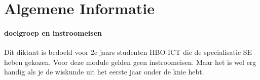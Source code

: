 \newcommand{\vecdriesnel}[1] {
$$
\begin{pmatrix} 
#1_1  \\ 
#1_2  \\ 
#1_3
\end{pmatrix}       $$}
\newcommand{\vectwee}[3][black] {
$$
\color{#1}
\begin{pmatrix} 
#2  \\ 
#3 
\end{pmatrix}       $$}
\newcommand{\vectweesnel}[1] {
$$
\begin{pmatrix} 
#1_1  \\ 
#1_2  
\end{pmatrix}       $$}
\newcommand{\vecvier}[4] {
$$
\begin{pmatrix} 
#1  \\ 
#2  \\ 
#3  \\
#4
\end{pmatrix}       $$}
\newcommand{\V}[1]{
$ \vec{#1} $}
\newcommand{\mattwee}[2]{
\begin{pmatrix}
#1 \\
#2
\end{pmatrix}}
\newcommand{\matdrie}[3]{
\begin{pmatrix}
#1 \\
#2 \\
#3
\end{pmatrix}}
\newcommand{\matvier}[4]{
\begin{pmatrix}
#1 \\
#2 \\
#3 \\
#4
\end{pmatrix}}


\tableofcontents

\chapter{Algemene Informatie}

\label{chap:algemeneinformatie}


\subsubsection{doelgroep en instroomeisen}
Dit diktaat is bedoeld voor 2e jaars studenten HBO-ICT die de specialisatie SE heben gekozen. Voor deze module gelden geen instroomeisen. Maar het is wel erg handig als je de wiskunde uit het eerste jaar onder de knie hebt.


